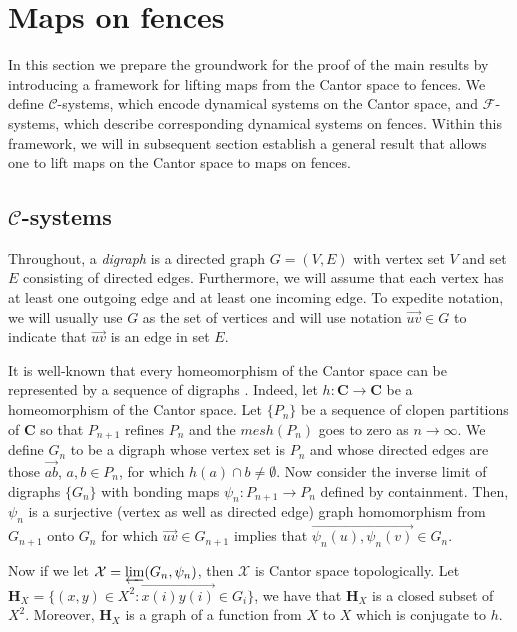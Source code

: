 \documentclass[11pt]{amsart}
\newcommand{\oa}{\overrightarrow}
\newcommand{\cantor}{\mathbf C}
\newcommand{\homeocantor}{{\mathbf H}_{X}}
\newcommand{\cC}{\mathcal{C}}
\newcommand{\cF}{\mathcal{F}}
\begin{document}
{\section{Maps on fences}\label{sec: Maps on fences}

In this section we prepare the groundwork for the proof of the main results by introducing a framework for lifting maps from the Cantor space to fences. We define $\cC$-systems, which encode dynamical systems on the Cantor space, and $\cF$-systems, which describe corresponding dynamical systems on fences. Within this framework, we will in subsequent section establish a general result that allows one to lift maps on the Cantor space to maps on fences.


\subsection{ $\cC$-systems}\label{subsec:csystmes}
Throughout, a \emph{digraph} is a directed graph $G= (V,E)$ with vertex set $V$ and set $E$ consisting of directed edges. Furthermore, we will assume that each vertex has at least one outgoing edge and at least one incoming edge. To expedite notation, we will usually use $G$  as the set of vertices and will use notation $\oa{uv} \in G$ to indicate that $\oa{uv}$ is an edge in set $E$.

It is well-known that every homeomorphism of the Cantor space can be represented by a sequence of digraphs \cite{AkinGlasnerWeiss,DarjiBernardes,shimomuraGraphCover}. Indeed, let $h:\cantor \rightarrow \cantor$ be a homeomorphism of the Cantor space. Let $\{P_n\}$ be a sequence of clopen partitions of $\cantor$ so that $P_{n+1}$ refines $P_n$ and the $mesh (P_n)$ goes to zero as $n \rightarrow \infty$. We define $G_n$ to be a digraph whose vertex set is $P_n$ and whose directed edges are   those $\oa{ab}$, $a, b \in P_n$, for which $h(a) \cap b \neq \emptyset$. Now consider the  inverse limit of digraphs $\{G_n\}$ with bonding maps $\psi_n: P_{n+1} \rightarrow P_{n}$ defined by containment. Then, $\psi_n$ is a surjective (vertex as well as directed edge) graph homomorphism from $G_{n+1}$ onto $G_n$ for which $ \oa {uv} \in G_{n+1}$ implies that $\oa {\psi_n(u),\psi_n(v)} \in G_n$.

Now if we let $\mathcal X = \varprojlim (G_n, \psi_n)$, then $\mathcal X$ is Cantor space topologically. Let $\homeocantor = \{(x, y) \in {X}^2: \oa{x(i)y(i)} \in G_i \}$, we have that $\homeocantor$ is a closed subset of $X^2$. Moreover, $\homeocantor$ is a graph of a function from $X$ to $X$ which is conjugate to $h$.

}
\end{document}
